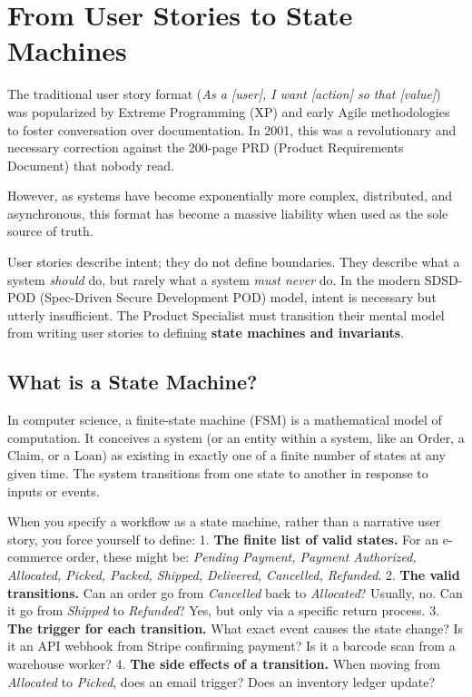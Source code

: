 \section{From User Stories to State
Machines}\label{from-user-stories-to-state-machines}

The traditional user story format (\emph{As a {[}user{]}, I want
{[}action{]} so that {[}value{]}}) was popularized by Extreme
Programming (XP) and early Agile methodologies to foster conversation
over documentation. In 2001, this was a revolutionary and necessary
correction against the 200-page PRD (Product Requirements Document) that
nobody read.

However, as systems have become exponentially more complex, distributed,
and asynchronous, this format has become a massive liability when used
as the sole source of truth.

User stories describe intent; they do not define boundaries. They
describe what a system \emph{should} do, but rarely what a system
\emph{must never} do. In the modern SDSD-POD (Spec-Driven Secure
Development POD) model, intent is necessary but utterly insufficient.
The Product Specialist must transition their mental model from writing
user stories to defining \textbf{state machines and invariants}.

\subsection{What is a State Machine?}\label{what-is-a-state-machine}

In computer science, a finite-state machine (FSM) is a mathematical
model of computation. It conceives a system (or an entity within a
system, like an Order, a Claim, or a Loan) as existing in exactly one of
a finite number of states at any given time. The system transitions from
one state to another in response to inputs or events.

When you specify a workflow as a state machine, rather than a narrative
user story, you force yourself to define: 1. \textbf{The finite list of
valid states.} For an e-commerce order, these might be: \emph{Pending
Payment, Payment Authorized, Allocated, Picked, Packed, Shipped,
Delivered, Cancelled, Refunded}. 2. \textbf{The valid transitions.} Can
an order go from \emph{Cancelled} back to \emph{Allocated}? Usually, no.
Can it go from \emph{Shipped} to \emph{Refunded}? Yes, but only via a
specific return process. 3. \textbf{The trigger for each transition.}
What exact event causes the state change? Is it an API webhook from
Stripe confirming payment? Is it a barcode scan from a warehouse worker?
4. \textbf{The side effects of a transition.} When moving from
\emph{Allocated} to \emph{Picked}, does an email trigger? Does an
inventory ledger update?


